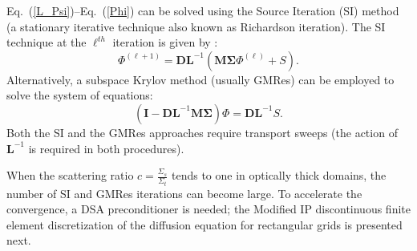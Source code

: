 \documentclass{mc2013}
\newcommand\bn{\boldsymbol{\nabla}}
\newcommand\bo{\boldsymbol{\Omega}}
\newcommand\br{\mathbf{r}}
\newcommand\bs{\boldsymbol}
\newcommand\mc{\mathcal}
\renewcommand{\(}{\left(}
\renewcommand{\)}{\right)}
\renewcommand{\[}{\left[}
\renewcommand{\]}{\right]}
\newcommand{\eqt}[1]{Eq.~(\ref{#1})}                     %
\begin{document}
\eqt{L_Psi}--\eqt{Phi} can be solved using the Source Iteration (SI) method (a
stationary iterative technique also known as Richardson iteration). The SI
technique at the $\ell^{th}$ iteration is given by :
\begin{equation}
  \Phi^{(\ell+1)} = \bs{DL}^{-1} \(\bs{M\Sigma}\Phi^{(\ell)} + S\) .
\end{equation}
Alternatively, a subspace Krylov method (usually GMRes) can be employed to
solve the system of equations:
\begin{equation}
  \(\bs{I} - \bs{DL}^{-1}\bs{M \Sigma}\) \Phi = \bs{DL}^{-1}S .
\end{equation}
Both the SI and the GMRes approaches require transport sweeps (the action of
$\bs{L}^{-1}$ is required in both procedures).

When the scattering ratio $c=\frac{\Sigma_s}{\Sigma_t}$ tends to one in
optically thick domains, the number of SI and GMRes iterations can become large. To
accelerate the convergence, a DSA preconditioner is needed; the Modified IP
discontinuous finite element discretization of the diffusion equation for
rectangular grids is presented next.

%


 \label{sec:mip}
\end{document}
